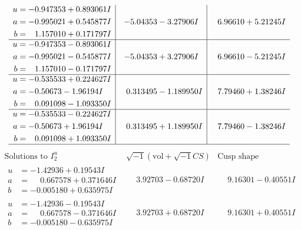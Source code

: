 \documentclass[1p]{elsarticle_modified}
\theoremstyle{definition}
\newcommand{\I}{\sqrt{-1}}
\begin{document}
$$\begin{array}{c|c|c}
\begin{aligned}
u &= -0.947353 + 0.893061 I \\
a &= -0.995021 + 0.545877 I \\
b &= \phantom{-}1.157010 + 0.171797 I\end{aligned}
 & -5.04353 - 3.27906 I & \phantom{-}6.96610 + 5.21245 I \\ \hline\begin{aligned}
u &= -0.947353 - 0.893061 I \\
a &= -0.995021 - 0.545877 I \\
b &= \phantom{-}1.157010 - 0.171797 I\end{aligned}
 & -5.04353 + 3.27906 I & \phantom{-}6.96610 - 5.21245 I \\ \hline\begin{aligned}
u &= -0.535533 + 0.224627 I \\
a &= -0.50673 - 1.96194 I \\
b &= \phantom{-}0.091098 - 1.093350 I\end{aligned}
 & \phantom{-}0.313495 - 1.189950 I & \phantom{-}7.79460 + 1.38246 I \\ \hline\begin{aligned}
u &= -0.535533 - 0.224627 I \\
a &= -0.50673 + 1.96194 I \\
b &= \phantom{-}0.091098 + 1.093350 I\end{aligned}
 & \phantom{-}0.313495 + 1.189950 I & \phantom{-}7.79460 - 1.38246 I\\
 \hline 
 \end{array}$$\newpage$$\begin{array}{c|c|c}  
\text{Solutions to }I^u_{2}& \I (\text{vol} + \sqrt{-1}CS) & \text{Cusp shape}\\
 \hline 
\begin{aligned}
u &= -1.42936 + 0.19543 I \\
a &= \phantom{-}0.667578 + 0.371646 I \\
b &= -0.005180 + 0.635975 I\end{aligned}
 & \phantom{-}3.92703 - 0.68720 I & \phantom{-}9.16301 - 0.40551 I \\ \hline\begin{aligned}
u &= -1.42936 - 0.19543 I \\
a &= \phantom{-}0.667578 - 0.371646 I \\
b &= -0.005180 - 0.635975 I\end{aligned}
 & \phantom{-}3.92703 + 0.68720 I & \phantom{-}9.16301 + 0.40551 I \\ \hline\begin{aligned}

\end{aligned}
\end{array}$$
\end{document}
